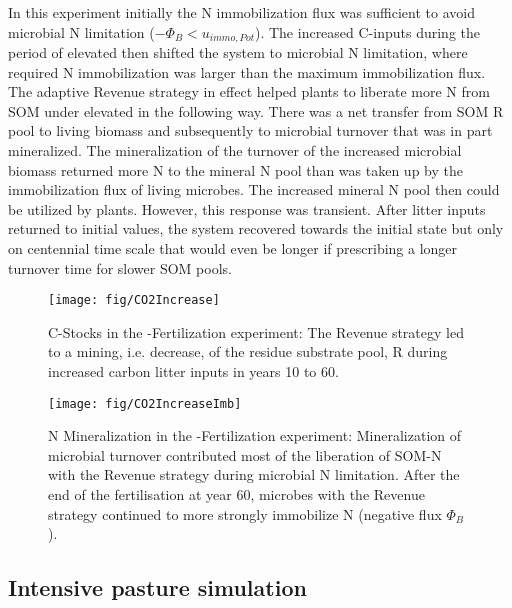 In this experiment initially the N immobilization flux was sufficient to avoid
microbial N limitation ($-\Phi_B < u_{immo,Pot}$). The increased C-inputs
during the period of elevated  then shifted the system to
microbial N limitation, where required N immobilization was larger than the maximum immobilization flux.
The adaptive Revenue strategy in effect helped plants to liberate more N from
SOM under elevated  in the following way. There was a net transfer
from SOM R pool to living biomass and subsequently to microbial turnover that
was in part mineralized. The mineralization of the turnover of the increased
microbial biomass returned more N to the mineral N pool than was taken up by the
immobilization flux of living microbes.
The increased mineral N pool then could be utilized by plants.
However, this response was transient. After litter inputs returned to initial
values, the system recovered towards the initial state but only on centennial
time scale that would even be longer if prescribing a longer turnover time for
slower SOM pools.

\begin{figure}[t] \vspace*{2mm}
\begin{center}
\texttt{[image: fig/CO2Increase]}
\end{center}
\caption{
C-Stocks in the -Fertilization experiment: The Revenue strategy led
to a mining, i.e. decrease, of the residue substrate pool, R during increased carbon
litter inputs in years 10 to 60.
\label{fig:CO2Increase}}

\end{figure}
\begin{figure}[t] \vspace*{2mm}
\begin{center}
\texttt{[image: fig/CO2IncreaseImb]} 
\end{center}
\caption{
N Mineralization in the -Fertilization experiment:
Mineralization of microbial turnover contributed most of the liberation of SOM-N
with the Revenue strategy during microbial N limitation.
After the end of the fertilisation at year 60, microbes with the Revenue
strategy continued to more strongly immobilize N (negative flux $\Phi_B$).
\label{fig:CO2IncreaseImb}}
\end{figure}

\subsection{Intensive pasture simulation}
\label{sec:ResultsPasture}

